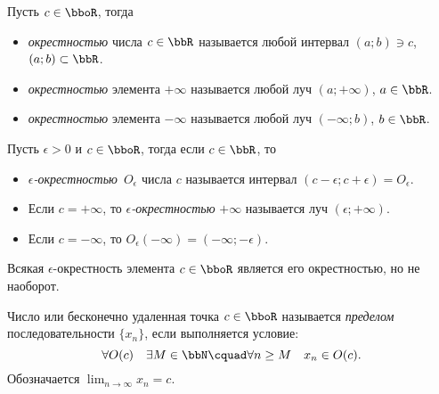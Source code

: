 \begin{defn}
Пусть $c \in \bboR$, тогда 
\begin{itemize}[wide, labelwidth=!, labelindent=0pt, nolistsep]
\item
\textit{окрестностью} числа $c \in \bbR$ называется любой интервал $(a;b)\ni c$, $(a;b) \subset \bbR$.
\item
\textit{окрестностью} элемента $+\infty$ называется любой луч $(a;+\infty)$, $a \in \bbR$.
\item
\textit{окрестностью} элемента $-\infty$ называется любой луч $(-\infty;b)$, $b \in \bbR$.
\end{itemize}
\end{defn}

\begin{defn}
Пусть $\epsilon > 0$ и $c \in \bboR $, тогда если $c \in \bbR$, то
\begin{itemize}[wide, labelwidth=!, labelindent=0pt, nolistsep]
\item
\textit{$\epsilon$-окрестностью}~$O_\epsilon$ числа $c$ называется интервал $(c-\epsilon;c+\epsilon) = O_\epsilon.$
\item
Если $c=+\infty$, то \textit{$\epsilon$-окрестностью} $+\infty$ называется луч $(\epsilon;+\infty)$.
\item
Если $c=-\infty$, то $O_\epsilon(-\infty)=(-\infty;-\epsilon)$.
\end{itemize}
\end{defn}
Всякая $\epsilon$-окрестность элемента $c \in \bboR$ является его окрестностью, но не наоборот.

\begin{defn}
Число или бесконечно удаленная точка $c \in \bboR$ называется \textit{пределом} последовательности $\{x_n\}$, если выполняется условие:
$$
\forall O(c)\quad \exists M \in \bbN\cquad \forall n \ge M\quad x_n \in O(c).
$$
Обозначается $\lim_{n \to \infty}\limits x_n = c$.
\end{defn}

